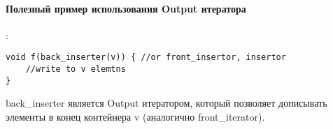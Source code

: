 \paragraph{Полезный пример использования Output итератора}:
\begin{lstlisting}
void f(back_inserter(v)) { //or front_insertor, insertor
	//write to v elemtns
}
\end{lstlisting}
back\_inserter является Output итератором, который позволяет дописывать элементы в конец контейнера v (аналогично front\_iterator).